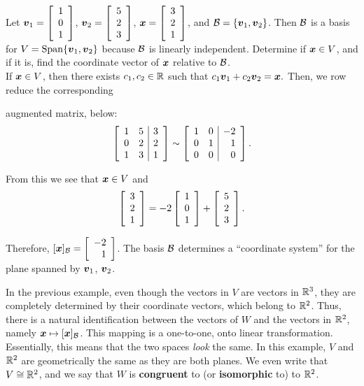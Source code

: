 \begin{Exam}
Let $\bb v_1 = \vr{1\\0\\1}$, $\bb v_2 = \vr{5\\2\\3}$, $\bb x = \vr{3\\2\\1}$, and $\B = \{\bb v_1, \bb v_2\}$. Then $\B$ is a basis for $V = \Span\{\bb v_1, \bb v_2\}$ because $\B$ is linearly independent. Determine if $\bb x \in V$, and if it is, find the coordinate vector of $\bb x$ relative to $\B$.\\

If $\bb x \in V$, then there exists $c_1, c_2 \in \R$ such that $c_1\bb v_1 + c_2\bb v_2 = \bb x.$ Then, we row reduce the corresponding \vspace{-0.15 in}
\begin{multicols}{2}
\noindent  augmented matrix, below:
\[\mtx{rr|r}{1&5&3\\0&2&2\\1&3&1} \sim \mtx{rr|r}{1&0&-2\\0&1&1\\0&0&0}.\] 

From this we see that $\bb x \in V$ and 
\[\vr{3\\2\\1} = -2\vr{1\\0\\1} + \vr{5\\2\\3}.\] 
\end{multicols} Therefore, $[\bb x]_\B = \vr{-2\\1}$. The basis $\B$ determines a ``coordinate system'' for the plane spanned by $\bb v_1$, $\bb v_2$.
\end{Exam}\vs

In the previous example, even though the vectors in $V$ are vectors in $\R^3$, they are completely determined by their coordinate vectors, which belong to $\R^2$. Thus, there is a natural identification between the vectors  of $W$ and the vectors in $\R^2$, namely $\bb x \mapsto [\bb x]_\B$. This mapping is a one-to-one, onto linear transformation. Essentially, this means that the two spaces \emph{look} the same. In this example, $V$ and $\R^2$ are geometrically the same as they are both planes. We even write that $V\cong \R^2$, and we say that $W$ is \textbf{congruent} to (or \textbf{isomorphic} to) to $\R^2$.\\

